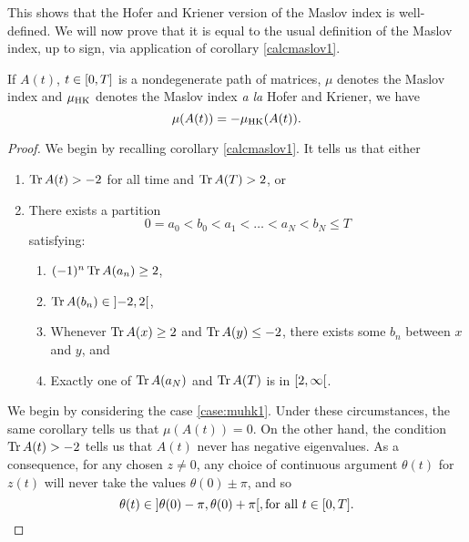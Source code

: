 This shows that the Hofer and Kriener version of the Maslov index is well-defined. We will now prove that it is equal to the usual definition of the Maslov index, up to sign, via application of corollary \ref{calcmaslov1}.

\begin{theorem}
If $A(t)$, $t \in \interval0T$ is a nondegenerate path of matrices, $\mu$ denotes the Maslov index and $\mu_{\mathrm{HK}}$ denotes the Maslov index \textit{a la} Hofer and Kriener, we have
\begin{equation}
\mu(A(t)) = -\mu_{\mathrm{HK}}(A(t)).
\end{equation}
\end{theorem}

\begin{proof}
We begin by recalling corollary \ref{calcmaslov1}. It tells us that either
\begin{enumerate}[label=\alph*., ref=\alph*]
\item\label{case:muhk1} $\operatorname{Tr} A(t) > -2$ for all time and $\operatorname{Tr} A(T) > 2$, or
\item\label{case:muhk2} There exists a partition
\begin{equation}\label{eq:muhkpartition}
0 = a_0 < b_0 < a_1 < \dots < a_N < b_N \leq T
\end{equation}
satisfying:
\begin{enumerate}[label=\roman*)]
\item $(-1)^n \operatorname{Tr} A(a_n) \geq 2$,
\item $\trace A(b_n) \in \ointerval{-2}2$,
\item Whenever $\operatorname{Tr} A(x) \geq 2$ and $\operatorname{Tr} A(y) \leq -2$, there exists some $b_n$ between $x$ and $y$, and
\item Exactly one of $\operatorname{Tr} A(a_N)$ and $\operatorname{Tr} A(T)$ is in $\rinterval2\infty$.
\end{enumerate}
\end{enumerate}

We begin by considering the case \ref{case:muhk1}. Under these circumstances, the same corollary tells us that $\mu(A(t)) = 0$. On the other hand, the condition $\operatorname{Tr} A(t) > -2$ tells us that $A(t)$ never has negative eigenvalues. As a consequence, for any chosen $z \neq 0$, any choice of continuous argument $\theta(t)$ for $z(t)$ will never take the values $\theta(0) \pm \pi$, and so
\begin{equation}\label{eq:thetaininterval}
\theta(t) \in \ointerval{\theta(0) - \pi}{\theta(0) + \pi}, \text{for all $t \in \interval0T$.}
\end{equation}


\end{proof}
